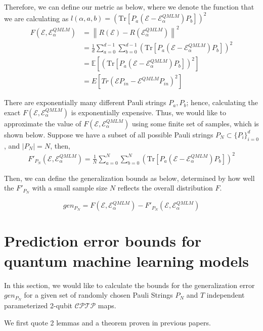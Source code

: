\documentclass[%
 reprint,
 amsmath,amssymb,
 aps,
]{revtex4-2}
\newcommand{\E}{\mathcal{E}}
\newcommand{\norm}[1]{\left\lVert#1\right\rVert}
\begin{document}
Therefore, we can define our metric as below, where we denote the function that we are calculating as $l(\alpha, a, b) = \left(\mathrm{Tr}\left[P_a(\E-\E^{QMLM}_\alpha)P_b\right]\right)^2$
\begin{equation}
\begin{split}
    F(\E, \E^{QMLM}_\alpha) &= \norm{R(\E)-R(\E^{QMLM}_\alpha)}^2\\
    &=\frac{1}{d}\sum_{a=0}^{d-1}\sum_{b=0}^{d-1}\left(\mathrm{Tr}\left[P_a(\E-\E^{QMLM}_\alpha)P_b\right]\right)^2\\
    &=\mathbb{E}\left[\left(\mathrm{Tr}\left[P_a(\E-\E^{QMLM}_\alpha)P_b\right]\right)^2\right]\\
    &=E [Tr(\E P_{in}-\E^{QMLM} P_{in})^2]
\end{split}
\end{equation}

There are exponentially many different Pauli strings $P_a, P_b$; hence, calculating the exact $F(\E, \E^{QMLM}_\alpha)$ is exponentially expensive. Thus, we would like to approximate the value of $F(\E, \E^{QMLM}_\alpha)$ using some finite set of samples, which is shown below. Suppose we have a subset of all possible Pauli strings $P_N\subset\{P_i\}_{i=0}^{d}$, and $|P_N|=N$, then,
\begin{equation}
\begin{split}
    F'_{P_N}(\E, \E^{QMLM}_\alpha)
    =\frac{1}{N}\sum_{a=0}^{N}\sum_{b=0}^{N}\left(\mathrm{Tr}\left[P_a(\E-\E^{QMLM}_\alpha)P_b\right]\right)^2
\end{split}
\end{equation}

Then, we can define the generalization bounds as below, determined by how well the $F'_{P_N}$ with a small sample size $N$ reflects the overall distribution $F$.

\begin{equation}
    gen_{P_N}=F(\E, \E^{QMLM}_\alpha) - F'_{P_N}(\E, \E^{QMLM}_\alpha)
\end{equation}

\section{Prediction error bounds for quantum machine learning models}
In this section, we would like to calculate the bounds for the generalization error $gen_{P_N}$ for a given set of randomly chosen Pauli Strings $P_N$ and $T$ independent parameterized 2-qubit $\mathcal{CPTP}$ maps.

We first quote 2 lemmas and a theorem proven in previous papers.
\end{document}

